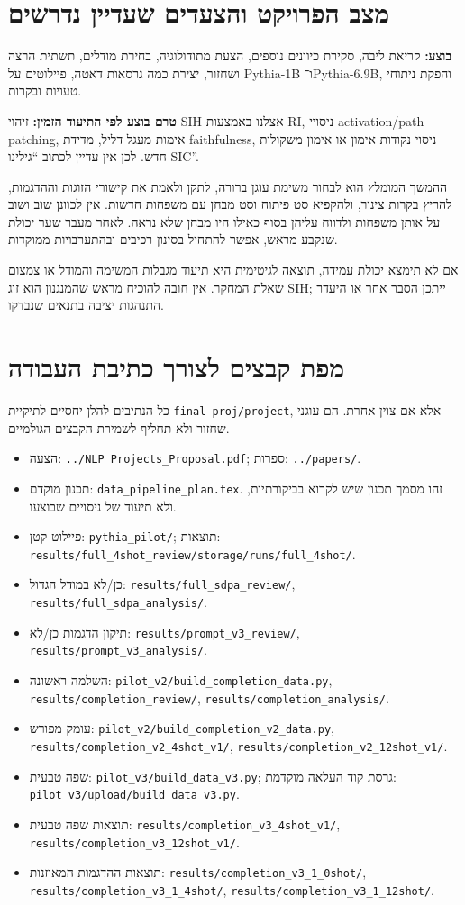 \documentclass[11pt,a4paper]{article}
\newcommand{\en}[1]{\textenglish{#1}}
\newcommand{\file}[1]{\textenglish{\nolinkurl{#1}}}
\begin{document}
\section{מצב הפרויקט והצעדים שעדיין נדרשים}
\textbf{בוצע:} קריאת ליבה, סקירת כיוונים נוספים, הצעת מתודולוגיה, בחירת מודלים, תשתית הרצה ושחזור, יצירת כמה גרסאות דאטה, פיילוטים על \en{Pythia-1B} ו־\en{Pythia-6.9B}, והפקת ניתוחי טעויות ובקרות.

\textbf{טרם בוצע לפי התיעוד הזמין:} זיהוי \en{SIH} אצלנו באמצעות \en{RI}, ניסויי \en{activation/path patching}, אימות מעגל דליל, מדידת \en{faithfulness}, ניסוי נקודות אימון או אימון משקולות חדש. לכן אין עדיין לכתוב ``גילינו \en{SIC}''.

ההמשך המומלץ הוא לבחור משימת עוגן ברורה, לתקן ולאמת את קישורי הזוגות וההדגמות, להריץ בקרות צינור, ולהקפיא סט פיתוח וסט מבחן עם משפחות חדשות. אין לכוונן שוב ושוב על אותן משפחות ולדווח עליהן בסוף כאילו היו מבחן שלא נראה. לאחר מעבר שער יכולת שנקבע מראש, אפשר להתחיל בסינון רכיבים ובהתערבויות ממוקדות.

אם לא תימצא יכולת עמידה, תוצאה לגיטימית היא תיעוד מגבלות המשימה והמודל או צמצום שאלת המחקר. אין חובה להוכיח מראש שהמנגנון הוא זוג \en{SIH}; ייתכן הסבר אחר או היעדר התנהגות יציבה בתנאים שנבדקו.

\appendix
\section{מפת קבצים לצורך כתיבת העבודה}
כל הנתיבים להלן יחסיים לתיקיית \file{final proj/project}, אלא אם צוין אחרת. הם עוגני שחזור ולא תחליף לשמירת הקבצים הגולמיים.
\begin{itemize}
\item הצעה: \file{../NLP Projects_Proposal.pdf}; ספרות: \file{../papers/}.
\item תכנון מוקדם: \file{data_pipeline_plan.tex}. זהו מסמך תכנון שיש לקרוא בביקורתיות, ולא תיעוד של ניסויים שבוצעו.
\item פיילוט קטן: \file{pythia_pilot/}; תוצאות: \file{results/full_4shot_review/storage/runs/full_4shot/}.
\item כן/לא במודל הגדול: \file{results/full_sdpa_review/}, \file{results/full_sdpa_analysis/}.
\item תיקון הדגמות כן/לא: \file{results/prompt_v3_review/}, \file{results/prompt_v3_analysis/}.
\item השלמה ראשונה: \file{pilot_v2/build_completion_data.py}, \file{results/completion_review/}, \file{results/completion_analysis/}.
\item עומק מפורש: \file{pilot_v2/build_completion_v2_data.py}, \file{results/completion_v2_4shot_v1/}, \file{results/completion_v2_12shot_v1/}.
\item שפה טבעית: \file{pilot_v3/build_data_v3.py}; גרסת קוד העלאה מוקדמת: \file{pilot_v3/upload/build_data_v3.py}.
\item תוצאות שפה טבעית: \file{results/completion_v3_4shot_v1/}, \file{results/completion_v3_12shot_v1/}.
\item תוצאות ההדגמות המאוזנות: \file{results/completion_v3_1_0shot/}, \file{results/completion_v3_1_4shot/}, \file{results/completion_v3_1_12shot/}.
\end{itemize}
\end{document}

